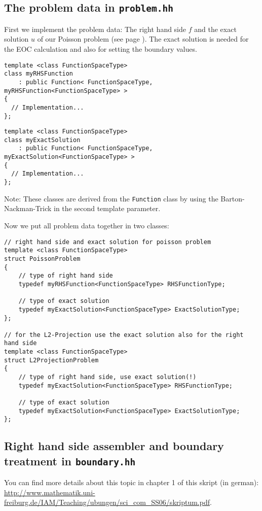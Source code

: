 \subsection{The problem data in \texttt{problem.hh} }
First we implement the problem data: The right hand side $f$ and the exact solution $u$ of our Poisson problem (see page \pageref{poissonproblem}). The exact solution is needed for the EOC calculation and also for setting the boundary values.
\begin{lstlisting}
template <class FunctionSpaceType>
class myRHSFunction
    : public Function< FunctionSpaceType, myRHSFunction<FunctionSpaceType> >
{
  // Implementation...
};
\end{lstlisting}

\begin{lstlisting}
template <class FunctionSpaceType>
class myExactSolution
    : public Function< FunctionSpaceType, myExactSolution<FunctionSpaceType> >
{
  // Implementation...
};
\end{lstlisting}
Note: These classes are derived from the \texttt{Function} class by using the Barton-Nackman-Trick in the second template parameter.

Now we put all problem data together in two classes:
\begin{lstlisting}
// right hand side and exact solution for poisson problem
template <class FunctionSpaceType>
struct PoissonProblem
{
    // type of right hand side
    typedef myRHSFunction<FunctionSpaceType> RHSFunctionType;

    // type of exact solution
    typedef myExactSolution<FunctionSpaceType> ExactSolutionType;
};

// for the L2-Projection use the exact solution also for the right hand side
template <class FunctionSpaceType>
struct L2ProjectionProblem
{
    // type of right hand side, use exact solution(!)
    typedef myExactSolution<FunctionSpaceType> RHSFunctionType;

    // type of exact solution
    typedef myExactSolution<FunctionSpaceType> ExactSolutionType;
};
\end{lstlisting}





\subsection{Right hand side assembler and boundary treatment in \texttt{boundary.hh} }
You can find more details about this topic in chapter 1 of this skript (in german): \url{http://www.mathematik.uni-freiburg.de/IAM/Teaching/ubungen/sci_com_SS06/skriptum.pdf}.

